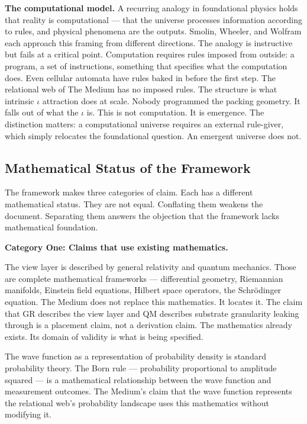 \documentclass[11pt,letterpaper]{article}
\begin{document}
\textbf{The computational model.} A recurring analogy in foundational physics holds that reality is computational --- that the universe processes information according to rules, and physical phenomena are the outputs. Smolin, Wheeler, and Wolfram each approach this framing from different directions. The analogy is instructive but fails at a critical point. Computation requires rules imposed from outside: a program, a set of instructions, something that specifies what the computation does. Even cellular automata have rules baked in before the first step. The relational web of The Medium has no imposed rules. The structure is what intrinsic \(\iota\) attraction does at scale. Nobody programmed the packing geometry. It falls out of what the \(\iota\) is. This is not computation. It is emergence. The distinction matters: a computational universe requires an external rule-giver, which simply relocates the foundational question. An emergent universe does not.

\subsection{Mathematical Status of the Framework}
\label{sec:orgad0d03a}

The framework makes three categories of claim. Each has a different mathematical status. They are not equal. Conflating them weakens the document. Separating them answers the objection that the framework lacks mathematical foundation.

\textbf{Category One: Claims that use existing mathematics.}

The view layer is described by general relativity and quantum mechanics. Those are complete mathematical frameworks — differential geometry, Riemannian manifolds, Einstein field equations, Hilbert space operators, the Schrödinger equation. The Medium does not replace this mathematics. It locates it. The claim that GR describes the view layer and QM describes substrate granularity leaking through is a placement claim, not a derivation claim. The mathematics already exists. Its domain of validity is what is being specified.

The wave function as a representation of probability density is standard probability theory. The Born rule --- probability proportional to amplitude squared --- is a mathematical relationship between the wave function and measurement outcomes. The Medium's claim that the wave function represents the relational web's probability landscape uses this mathematics without modifying it.
\end{document}
